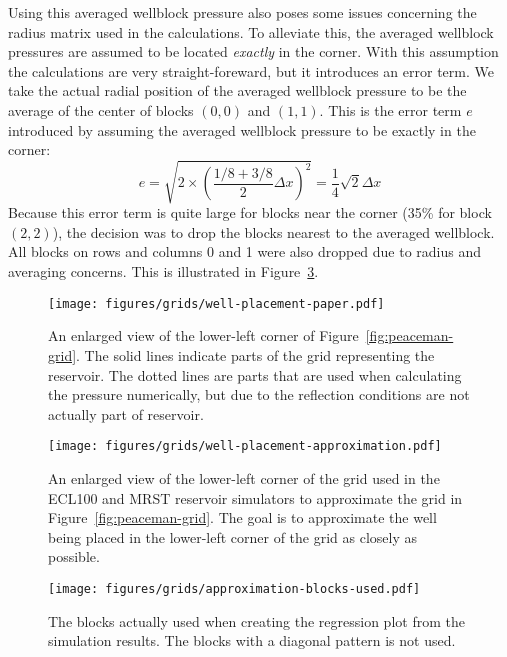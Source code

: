 Using this averaged wellblock pressure also poses some issues concerning the radius matrix used in the calculations. To alleviate this, the averaged wellblock pressures are assumed to be located \emph{exactly} in the corner. With this assumption the calculations are very straight-foreward, but it introduces an error term. We take the actual radial position of the averaged wellblock pressure to be the average of the center of blocks $(0,0)$ and $(1,1)$. This is the error term $e$ introduced by assuming the averaged wellblock pressure to be exactly in the corner:
\begin{equation}
    e = \sqrt{2\times \left( \frac{1/8+3/8}{2}\Delta x \right)^2} = \frac{1}{4}\sqrt{2}\Delta x
\end{equation}
Because this error term is quite large for blocks near the corner (35\% for block $(2,2)$), the decision was to drop the blocks nearest to the averaged wellblock. All blocks on rows and columns 0 and 1 were also dropped due to radius and averaging concerns. This is illustrated in Figure~\ref{fig:blocks-used}.

\begin{figure}[htbp]
    \centering
    \texttt{[image: figures/grids/well-placement-paper.pdf]}
    \caption{An enlarged view of the lower-left corner of Figure~\ref{fig:peaceman-grid}. The solid lines indicate parts of the grid representing the reservoir. The dotted lines are parts that are used when calculating the pressure numerically, but due to the reflection conditions are not actually part of reservoir.}
    \label{fig:well-placement-paper}
\end{figure}

\begin{figure}[htbp]
    \centering
    \texttt{[image: figures/grids/well-placement-approximation.pdf]}
    \caption{An enlarged view of the lower-left corner of the grid used in the ECL100 and MRST reservoir simulators to approximate the grid in Figure~\ref{fig:peaceman-grid}. The goal is to approximate the well being placed in the lower-left corner of the grid as closely as possible.}
    \label{fig:well-placement-approximation}
\end{figure}

\begin{figure}[htbp]
    \centering
    \texttt{[image: figures/grids/approximation-blocks-used.pdf]}
    \caption{The blocks actually used when creating the regression plot from the simulation results. The blocks with a diagonal pattern is not used.}
    \label{fig:blocks-used}
\end{figure}

